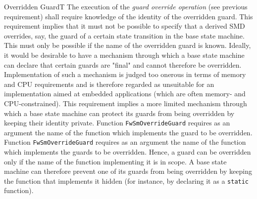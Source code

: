 \documentclass[requirements]{../fwprofile}
\begin{document}
\begin{fw_req_note}{Overridden Guard}{T}
{The execution of the \emph{guard override operation} (see previous
requirement) shall require knowledge of the identity of the overridden guard.}
{This requirement implies that it must not be possible to specify that a derived 
SMD overrides, say, the guard of a certain state transition in the base state machine. 
This must only be possible if the name of the overridden guard is known.}
{Ideally, it would be desirable to have a mechanism through which a base 
state machine can declare that certain guards are "final" and cannot therefore be overridden. 
Implementation of such a mechanism is judged too onerous in terms of memory and CPU requirements 
and is therefore regarded as unsuitable for an implementation aimed at embedded applications 
(which are often memory- and CPU-constrained). 
This requirement implies a more limited mechanism through which a base state machine can protect 
its guards from being overridden by keeping their identity private.}
{Function \texttt{FwSmOverrideGuard} requires as an argument the name of 
the function which implements the guard to be overridden.} 
{Function \texttt{FwSmOverrideGuard} requires as an argument the name of 
the function which implements the guards to be overridden. 
Hence, a guard can be overridden only if the name of the function implementing it is in scope. 
A base state machine can therefore prevent one of its guards from being overridden by keeping 
the function that implements it hidden (for instance, by declaring it as a \texttt{static} 
function).}
\end{fw_req_note}
\end{document}
